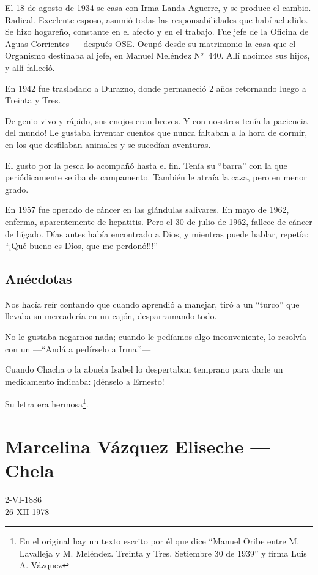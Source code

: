\documentclass{article}
\begin{document}
El 18 de agosto de 1934 se casa con Irma Landa Aguerre, y se produce el cambio. Radical. Excelente esposo, asumió todas las responsabilidades que habí aeludido. Se hizo hogareño, constante en el afecto y en el trabajo. Fue jefe de la Oficina de Aguas Corrientes --- después OSE. Ocupó desde su matrimonio la casa que el Organismo destinaba al jefe, en Manuel Meléndez N$^o$~440. Allí nacimos sus hijos, y allí falleció.

En 1942 fue trasladado a Durazno, donde permaneció 2 años retornando luego a Treinta y Tres.

De genio vivo y rápido, sus enojos eran breves. Y con nosotros tenía la paciencia del mundo! Le gustaba inventar cuentos que nunca faltaban a la hora de dormir, en los que desfilaban animales y se sucedían aventuras.

El gusto por la pesca lo acompañó hasta el fin. Tenía su ``barra'' con la que periódicamente se iba de campamento. También le atraía la caza, pero en menor grado.

En 1957 fue operado de cáncer en las glándulas salivares. En mayo de 1962, enferma, aparentemente de hepatitis. Pero el 30 de julio de 1962, fallece de cáncer de hígado. Días antes había encontrado a Dios, y mientras puede hablar, repetía: ``¡Qué bueno es Dios, que me perdonó!!!''

\subsection{Anécdotas}

Nos hacía reír contando que cuando aprendió a manejar, tiró a un ``turco'' que llevaba su mercadería en un cajón, desparramando todo.

No le gustaba negarnos nada; cuando le pedíamos algo inconveniente, lo resolvía con un ---``Andá a pedírselo a Irma.''---

Cuando Chacha o la abuela Isabel lo despertaban temprano para darle un medicamento indicaba: ¡dénselo a Ernesto!

Su letra era hermosa\footnote{En el original hay un texto escrito por él que dice ``Manuel Oribe entre M. Lavalleja y M. Meléndez. Treinta y Tres, Setiembre 30 de 1939'' y firma Luis A. Vázquez}.

\section{Marcelina Vázquez Eliseche --- Chela}

2-VI-1886\\
26-XII-1978
\end{document}
